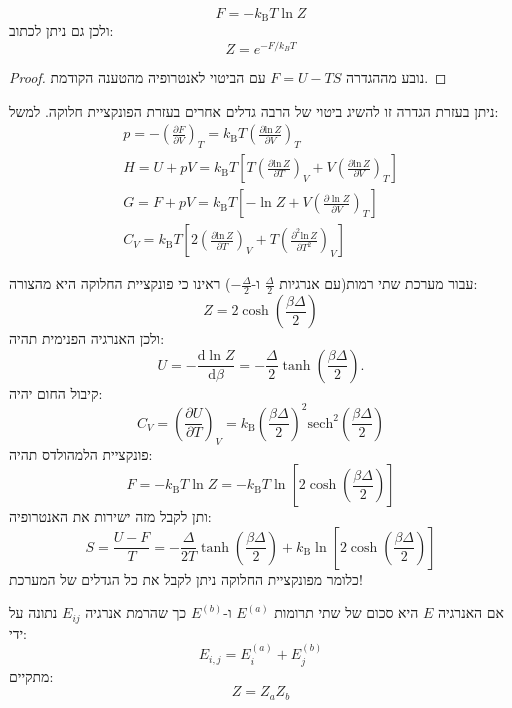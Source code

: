 \documentclass{tstextbook}
\begin{document}
\begin{proposition}
$$F=-k_{\mathrm{B}}T\ln Z$$
ולכן גם ניתן לכתוב:
$$Z=e^{ -F/k_{B}T }$$

\end{proposition}
\begin{proof}
נובע מההגדרה \(F=  U-  T  S\) עם הביטוי לאנטרופיה מהטענה הקודמת.

\end{proof}
\begin{corollary}
ניתן בעזרת הגדרה זו להשיג ביטוי של הרבה גדלים אחרים בעזרת הפונקציית חלוקה. למשל:
\begin{gather*}p=-\left({\frac{\partial F}{\partial V}}\right)_{T}=k_{\mathrm{B}}T\left({\frac{\partial\mathrm{ln}\,Z}{\partial V}}\right)_{T}  \\H=U+p V=k_{\mathrm{{B}}}T\left[T\left({\frac{\partial\mathrm{ln}\,Z}{\partial T}}\right)_{V}+V\left({\frac{\partial\mathrm{ln}\,Z}{\partial V}}\right)_{T}\right] \\G=F+p V=k_{\mathrm{{B}}}T\left[-\ln Z+V\left({\frac{\partial\ln Z}{\partial V}}\right)_{T}\right] \\C_{V}=k_{\mathrm{{B}}}T\left[2\left(\frac{\partial\mathrm{ln}\,Z}{\partial T}\right)_{V}+T\left(\frac{\partial^{2}\mathrm{ln}\,Z}{\partial T^{2}}\right)_{V}\right]
\end{gather*}

\end{corollary}
\begin{example}
עבור מערכת שתי רמות(עם אנרגיות \(\frac{\Delta}{2}\) ו-\(-\frac{\Delta}{2}\)) ראינו כי פונקציית החלוקה היא מהצורה:
$$Z=2\cosh\left(\frac{\beta\Delta}{2}\right)$$
ולכן האנרגיה הפנימית תהיה:
$$U=-\frac{\mathrm{d}\ln Z}{\mathrm{d}\beta}=-\frac{\Delta}{2}\operatorname{tanh}\left(\frac{\beta\Delta}{2}\right).$$
קיבול החום יהיה:
$$C_{V}=\left({\frac{\partial U}{\partial T}}\right)_{V}=k_{\mathrm{B}}\left({\frac{\beta\Delta}{2}}\right)^{2}\mathrm{sech}^{2}\left({\frac{\beta\Delta}{2}}\right)$$
פונקציית הלמהולדס תהיה:
$$F=-k_{\mathrm{B}}T\ln Z=-k_{\mathrm{B}}T\ln\left[2\cosh\left({\frac{\beta\Delta}{2}}\right)\right]$$
ותן לקבל מזה ישירות את האנטרופיה:
$$S=\frac{U-F}{T}=-\frac{\Delta}{2T}\operatorname{tanh}\left(\frac{\beta\Delta}{2}\right)+k_{\mathrm{B}}\ln\left[2\cosh\left(\frac{\beta\Delta}{2}\right)\right]$$
כלומר מפונקציית החלוקה ניתן לקבל את כל הגדלים של המערכת!

\end{example}
\begin{proposition}
אם האנרגיה \(E\) היא סכום של שתי תרומות \(E^{(a)}\) ו-\(E^{(b)}\) כך שהרמת אנרגיה \(E_{ij}\) נתונה על ידי:
$$E_{i,j}=E_{i}^{(a)}+E_{j}^{(b)}$$
מתקיים:
$$Z=Z_{a}Z_{b}$$

\end{proposition}
\end{document}
